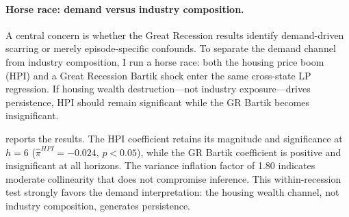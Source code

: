 \documentclass[12pt]{article}
\begin{document}
\paragraph{Horse race: demand versus industry composition.} A central concern is whether the Great Recession results identify demand-driven scarring or merely episode-specific confounds. To separate the demand channel from industry composition, I run a horse race: both the housing price boom (HPI) and a Great Recession Bartik shock enter the same cross-state LP regression. If housing wealth destruction---not industry exposure---drives persistence, HPI should remain significant while the GR Bartik becomes insignificant.

 reports the results. The HPI coefficient retains its magnitude and significance at $h=6$ ($\hat{\pi}^{HPI} = -0.024$, $p < 0.05$), while the GR Bartik coefficient is positive and insignificant at all horizons. The variance inflation factor of 1.80 indicates moderate collinearity that does not compromise inference. This within-recession test strongly favors the demand interpretation: the housing wealth channel, not industry composition, generates persistence.
\end{document}
